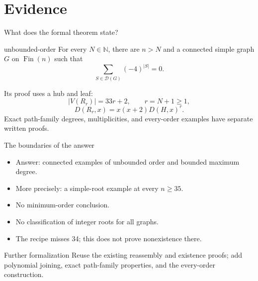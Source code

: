 \documentclass{beamer}
\begin{document}
\section{Evidence}
\begin{frame}{What does the formal theorem state?}
\begin{bookresult}{unbounded-order}
For every $N\in\mathbb N$, there are $n>N$ and a connected simple graph $G$ on $\operatorname{Fin}(n)$ such that
\[\sum_{S\in\mathcal D(G)}(-4)^{|S|}=0.\]
\end{bookresult}
Its proof uses a hub and leaf:
\[|V(R_r)|=33r+2,\qquad r=N+1\geq1,\]
\[D(R_r,x)=x(x+2)D(H,x)^r.\]
Exact path-family degrees, multiplicities, and every-order examples have separate written proofs.
\end{frame}
\begin{frame}{The boundaries of the answer}
\begin{itemize}
\item Answer: connected examples of unbounded order and bounded maximum degree.
\item More precisely: a simple-root example at every $n\geq35$.
\item No minimum-order conclusion.
\item No classification of integer roots for all graphs.
\item The recipe misses 34; this does not prove nonexistence there.
\end{itemize}
\begin{block}{Further formalization}
Reuse the existing reassembly and existence proofs; add polynomial joining, exact path-family properties, and the every-order construction.
\end{block}
\end{frame}
\end{document}
